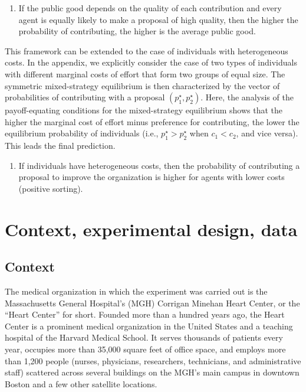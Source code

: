 \documentclass[11pt, titlepage]{article}
\providecommand{\tightlist}{%
  \setlength{\itemsep}{0pt}\setlength{\parskip}{0pt}}
\begin{document}
\begin{enumerate}
\def\labelenumi{\arabic{enumi})}
\setcounter{enumi}{3}
\tightlist
\item
  If the public good depends on the quality of each contribution and
  every agent is equally likely to make a proposal of high quality, then
  the higher the probability of contributing, the higher is the average
  public good.
\end{enumerate}

This framework can be extended to the case of individuals with
heterogeneous costs. In the appendix, we explicitly consider the case of
two types of individuals with different marginal costs of effort that
form two groups of equal size. The symmetric mixed-strategy equilibrium
is then characterized by the vector of probabilities of contributing
with a proposal \((p_1^\star, p_2^\star)\). Here, the analysis of the
payoff-equating conditions for the mixed-strategy equilibrium shows that
the higher the marginal cost of effort minus preference for
contributing, the lower the equilibrium probability of individuals
(i.e., \(p_1^\star > p_2^\star\) when \(c_1 < c_2\), and vice versa).
This leads the final prediction.

\begin{enumerate}
\def\labelenumi{\arabic{enumi})}
\setcounter{enumi}{4}
\tightlist
\item
  If individuals have heterogeneous costs, then the probability of
  contributing a proposal to improve the organization is higher for
  agents with lower costs (positive sorting).
\end{enumerate}

\section{Context, experimental design,
data}\label{context-experimental-design-data}

\subsection{Context}\label{context}

The medical organization in which the experiment was carried out is the
Massachusetts General Hospital's (MGH) Corrigan Minehan Heart Center, or
the ``Heart Center'' for short. Founded more than a hundred years ago,
the Heart Center is a prominent medical organization in the United
States and a teaching hospital of the Harvard Medical School. It serves
thousands of patients every year, occupies more than 35,000 square feet
of office space, and employs more than 1,200 people (nurses, physicians,
researchers, technicians, and administrative staff) scattered across
several buildings on the MGH's main campus in downtown Boston and a few
other satellite locations.
\end{document}
